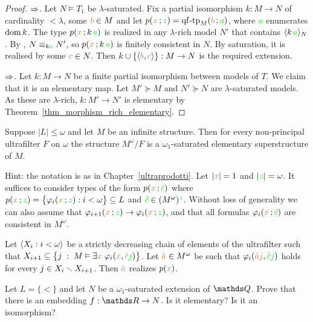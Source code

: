 \begin{proof}$\Rightarrow$. Let $N\models T_1$ be $\lambda\mbox{-}$saturated. Fix a partial isomorphism $k:M\to N$ of cardinality $<\lambda$, some ${\color{brown} b}\in M$ and let $p({\color{brown} x}\,;{\color{green} z})={\rm qf\mbox{-}tp}_M({\color{brown} b}\,;{\color{green} a})$, where ${\color{green} a}$ enumerates $\mathop{\rm dom} k$. The type $p({\color{brown} x}\,;k\,{\color{green} a})$ is realized in any $\lambda\mbox{-}$rich model $N'$ that contains $\langle k\,{\color{green} a}\rangle_N$. By , $N\equiv_{k{\color{green} a}} N'$, so $p({\color{brown} x}\,;k\,{\color{green} a})$ is finitely consistent in $N$.  By saturation, it is realised by some ${\color{brown} c}\in N$. Then $k\cup \{\langle{\color{brown}b},{\color{brown} c}\rangle\}:M\to N$ is the required extension.


$\Rightarrow$. Let $k:M\to N$ be a finite partial isomorphism between models of $T$. We claim that it is an elementary map. Let $M'\succeq M$ and $N'\succeq N$ are $\lambda$-saturated models. As these are $\lambda$-rich, $k:M'\to N'$ is elementary by Theorem~\ref{thm_morphism_rich_elementary}.
\end{proof}

\begin{exercise}
  Suppose $|L|\le\omega$ and let $M$ be an infinite structure. Then for every non-principal ultrafilter $F$ on $\omega$ the structure $M^\omega/F$ is a $\omega_1$-saturated elementary superstructure of $M$.

  Hint: the notation is as in Chapter~\ref{ultraprodotti}. Let $|{\color{brown} x}|=1$ and 
  $|{\color{green} z}|=\omega$. It suffices to consider types of the form $p({\color{brown} x}\,;{\color{green}\hat c})$ where $p({\color{brown} x}\,;{\color{green} z})=\big\{\varphi_i({\color{brown} x}\,;{\color{green} z}):i<\omega\big\}\subseteq L$ and ${\color{green}\hat c}\in(M^\omega)^{\color{green} z}$. Without loss of generality we can also assume that $\varphi_{i+1}({\color{brown} x}\,;{\color{green} z})\rightarrow\varphi_i({\color{brown} x}\,;{\color{green} z})$, and that all formulas $\varphi_i({\color{brown} x}\,;{\color{green}\hat c})$ are consistent in $M^\omega$. 

  Let $\langle X_i:i<\omega\rangle$ be a strictly decreasing chain of elements of the ultrafilter such that  $X_{i+1}\subseteq\big\{j\;:\;M\vDash\exists{\color{brown}x}\;\varphi_i({\color{brown} x},{\color{green}\hat cj})\big\}$. Let ${\color{brown}\hat a}\in M^\omega$ be such that  $\varphi_i({\color{brown}\hat aj},{\color{green}\hat cj})$ holds for every $j\in X_i\smallsetminus X_{i+1}$. Then ${\color{brown}\hat a}$ realizes $p({\color{brown} x})$.
\end{exercise}
  
\begin{exercise}
  Let $L = \{<\}$ and let $N$ be a $\omega_1$-saturated extension of $\QQ$.
  Prove that there is an embedding $f:\RR \to  N$.
  Is it elementary?
  Is it an isomorphism?
\end{exercise}

